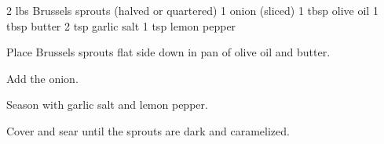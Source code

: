 \dishtype{\side}
\dishother{\vegetarian}
\begin{ingreds}
    2 lbs Brussels sprouts (halved or quartered)
    1 onion (sliced) 
    1 tbsp olive oil
    1 tbsp butter
    2 tsp garlic salt
    1 tsp lemon pepper        
\end{ingreds}
\begin{method}
    Place Brussels sprouts flat side down in pan of olive oil and butter.\par
    Add the onion.\par
    Season with garlic salt and lemon pepper.\par
    Cover and sear until the sprouts are dark and caramelized.
\end{method}